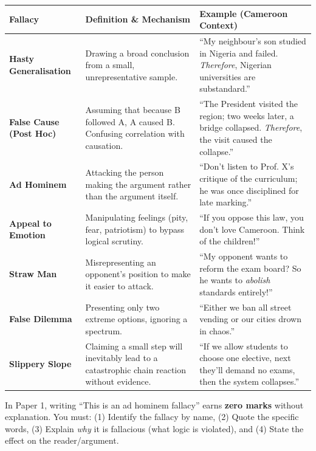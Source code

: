 \documentclass[11pt]{article}
\begin{document}
\begin{center}
\begin{tabularx}{\linewidth}{|l|X|X|}
\hline
\rowcolor{popblueL}
\textbf{Fallacy} & \textbf{Definition \& Mechanism} & \textbf{Example (Cameroon Context)} \\
\hline
\textbf{Hasty Generalisation} & Drawing a broad conclusion from a small, unrepresentative sample. & ``My neighbour's son studied in Nigeria and failed. \emph{Therefore}, Nigerian universities are substandard.'' \\
\hline
\textbf{False Cause (Post Hoc)} & Assuming that because B followed A, A caused B. Confusing correlation with causation. & ``The President visited the region; two weeks later, a bridge collapsed. \emph{Therefore}, the visit caused the collapse.'' \\
\hline
\textbf{Ad Hominem} & Attacking the person making the argument rather than the argument itself. & ``Don't listen to Prof. X's critique of the curriculum; he was once disciplined for late marking.'' \\
\hline
\textbf{Appeal to Emotion} & Manipulating feelings (pity, fear, patriotism) to bypass logical scrutiny. & ``If you oppose this law, you don't love Cameroon. Think of the children!'' \\
\hline
\textbf{Straw Man} & Misrepresenting an opponent's position to make it easier to attack. & ``My opponent wants to reform the exam board? So he wants to \emph{abolish} standards entirely!'' \\
\hline
\textbf{False Dilemma} & Presenting only two extreme options, ignoring a spectrum. & ``Either we ban all street vending or our cities drown in chaos.'' \\
\hline
\textbf{Slippery Slope} & Claiming a small step will inevitably lead to a catastrophic chain reaction without evidence. & ``If we allow students to choose one elective, next they'll demand no exams, then the system collapses.'' \\
\hline
\end{tabularx}
\end{center}

\begin{attention}
In Paper 1, writing ``This is an ad hominem fallacy'' earns \textbf{zero marks} without explanation. You must: (1) Identify the fallacy by name, (2) Quote the specific words, (3) Explain \emph{why} it is fallacious (what logic is violated), and (4) State the effect on the reader/argument.
\end{attention}
\end{document}
